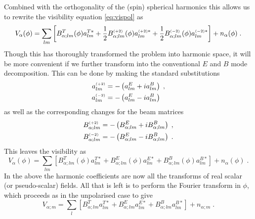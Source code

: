 \documentclass{revtex4}
\begin{document}
Combined with the orthogonality of the (spin) spherical harmonics this
allows us to rewrite the visibility equation \eqref{eq:vispol} as
\begin{equation}
V_{\alpha}(\phi) = \sum_{lm} \left[B_{\alpha;lm}^T(\phi) a^{T*}_{lm} +
\frac{1}{2} B_{\alpha;lm}^{\scriptscriptstyle \left(+2\right)}(\phi) a^{{\scriptscriptstyle \left(+2\right)}*}_{lm} +
\frac{1}{2} B_{\alpha;lm}^{\scriptscriptstyle \left(-2\right)}(\phi) a^{{\scriptscriptstyle \left(-2\right)}*}_{lm}\right] + n_{\alpha}(\phi)
\; .
\end{equation}
Though this has thoroughly transformed the problem into harmonic
space, it will be more convenient if we further transform into the
conventional $E$ and $B$ mode decomposition. This can be done by
making the standard substitutions
\begin{align}
a^{\scriptscriptstyle \left(+2\right)}_{lm} & = -\left(a^E_{lm} + i a^B_{lm}\right) \; ,\\
a^{\scriptscriptstyle \left(-2\right)}_{lm} & = -\left(a^E_{lm} - i a^B_{lm}\right)
\end{align}
as well as the corresponding changes for the beam matrices
\begin{align}
  B^{\scriptscriptstyle \left(+2\right)}_{\alpha;lm} & = -\left(B^E_{\alpha;lm} + i B^B_{\alpha;lm}\right) \; ,\\
  B^{\scriptscriptstyle \left(-2\right)}_{\alpha;lm} & = -\left(B^E_{\alpha;lm} - i B^B_{\alpha;lm}\right)
  \; .
\end{align}
This leaves the visibility as
\begin{equation}
V_{\alpha}(\phi) = \sum_{lm} \left[B_{\alpha;lm}^T(\phi) a^{T*}_{lm} +
B_{\alpha;lm}^E(\phi) a^{E*}_{lm} + B_{\alpha;lm}^B(\phi)
a^{B*}_{lm}\right] + n_{\alpha}(\phi)
\; .
\end{equation}
In the above the harmonic coefficients are now all the transforms of real scalar
(or pseudo-scalar) fields. All that is left is to perform the Fourier transform
in $\phi$, which proceeds as in the unpolarised case to give
\begin{equation}
V_{\alpha; m} = \sum_{l} \left[B_{\alpha;lm}^T a^{T*}_{lm} +
B_{\alpha;lm}^E a^{E*}_{lm} + B_{\alpha;lm}^B
a^{B*}_{lm}\right] + n_{\alpha; m}
\; .
\end{equation}
\end{document}
